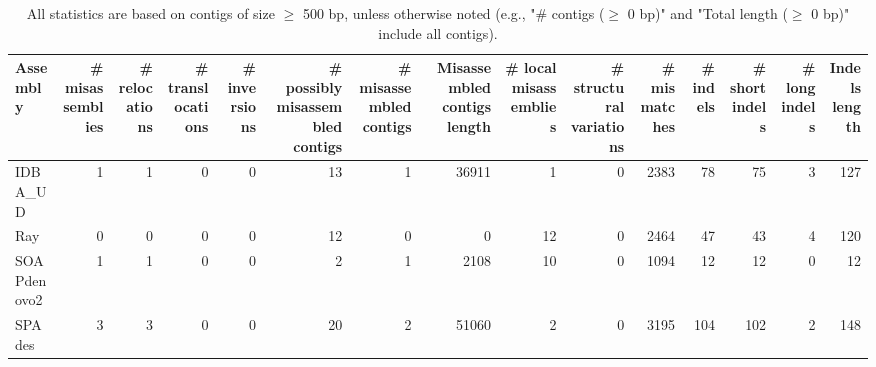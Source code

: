 \documentclass[12pt,a4paper]{article}
\begin{document}
\begin{table}[ht]
\begin{center}
\caption{All statistics are based on contigs of size $\geq$ 500 bp, unless otherwise noted (e.g., "\# contigs ($\geq$ 0 bp)" and "Total length ($\geq$ 0 bp)" include all contigs).}
\begin{tabular}{|l*{14}{|r}|}
\hline
Assembly & \# misassemblies &     \# relocations &     \# translocations &     \# inversions & \# possibly misassembled contigs & \# misassembled contigs & Misassembled contigs length & \# local misassemblies & \# structural variations & \# mismatches & \# indels &     \# short indels &     \# long indels & Indels length \\ \hline
IDBA\_UD & 1 & 1 & 0 & 0 & 13 & 1 & 36911 & 1 & 0 & 2383 & 78 & 75 & 3 & 127 \\ \hline
Ray & 0 & 0 & 0 & 0 & 12 & 0 & 0 & 12 & 0 & 2464 & 47 & 43 & 4 & 120 \\ \hline
SOAPdenovo2 & 1 & 1 & 0 & 0 & 2 & 1 & 2108 & 10 & 0 & 1094 & 12 & 12 & 0 & 12 \\ \hline
SPAdes & 3 & 3 & 0 & 0 & 20 & 2 & 51060 & 2 & 0 & 3195 & 104 & 102 & 2 & 148 \\ \hline
\end{tabular}
\end{center}
\end{table}
\end{document}
